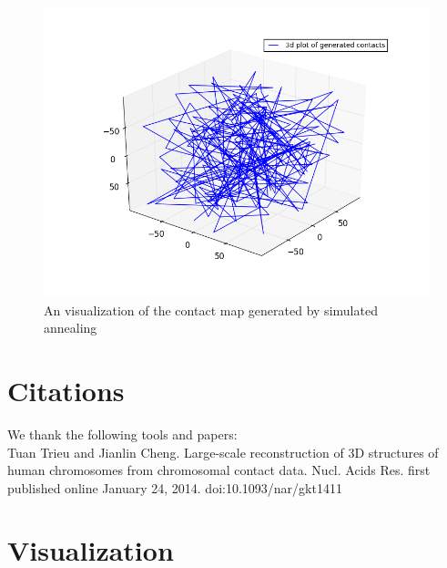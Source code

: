 \documentclass{article}
\begin{document}
\begin{figure}[H]
\begin{center}
\includegraphics[width=\textwidth]{sa_150}
\caption{An visualization of the contact map generated by simulated annealing}
\label{Fig:sa_150}
\end{center}
\end{figure}

\section{Citations}

We thank the following tools and papers: \\

Tuan Trieu and Jianlin Cheng.  Large-scale reconstruction of 3D structures of human chromosomes from chromosomal contact data.  Nucl. Acids Res. first published online January 24, 2014. doi:10.1093/nar/gkt1411


\section{Visualization}
\end{document}
